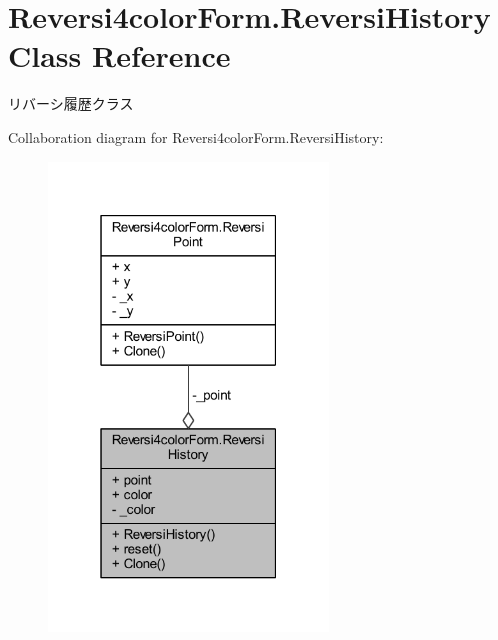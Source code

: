 \hypertarget{class_reversi4color_form_1_1_reversi_history}{}\section{Reversi4color\+Form.\+Reversi\+History Class Reference}
\label{class_reversi4color_form_1_1_reversi_history}


リバーシ履歴クラス  




Collaboration diagram for Reversi4color\+Form.\+Reversi\+History\+:\nopagebreak
\begin{figure}[H]
\begin{center}
\leavevmode
\includegraphics[width=211pt]{class_reversi4color_form_1_1_reversi_history__coll__graph}
\end{center}
\end{figure}
